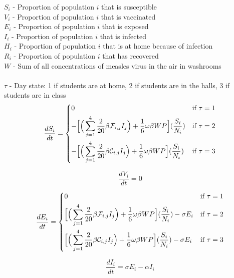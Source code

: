 \documentclass[fleqn]{article}
\begin{document}
$S_i$ - Proportion of population $i$ that is susceptible \\
$V_i$ - Proportion of population $i$ that is vaccinated \\
$E_i$ - Proportion of population $i$ that is exposed \\
$I_i$ - Proportion of population $i$ that is infected \\
$H_i$ - Proportion of population $i$ that is at home because of infection \\
$R_i$ - Proportion of population $i$ that has recovered \\
$W$ - Sum of all concentrations of measles virus in the air in washrooms\\ \\
$\tau$ - Day state: 1 if students are at home, 2 if students are in the halls, 3 if \indent students are in class
\begin{equation}
\dfrac{dS_i}{dt} = 
\begin{dcases}
	0 & \text{if $\tau = 1$} \\
	- \Big[\Big(\sum_{j=1}^4 \dfrac{2}{20} \beta \mathcal{F}_{i,j} I_j \Big) + \dfrac{1}{6} \omega \beta W P \Big](\dfrac{S_i}{N_i}) & \text{if $\tau = 2$} \\
	- \Big[\Big(\sum_{j=1}^4 \dfrac{2}{20} \beta \mathcal{C}_{i,j} I_j \Big) + \dfrac{1}{6} \omega \beta W P \Big](\dfrac{S_i}{N_i}) & \text{if $\tau = 3$} 	
\end{dcases}
\end{equation}

\begin{equation}
\dfrac{dV_i}{dt} = 0
\end{equation}

\begin{equation}
\dfrac{dE_i}{dt} = 
\begin{dcases}
	0 & \text{if $\tau = 1$} \\
	\Big[\Big(\sum_{j=1}^4 \dfrac{2}{20} \beta \mathcal{F}_{i,j} I_j \Big) + \dfrac{1}{6} \omega \beta W P \Big](\dfrac{S_i}{N_i}) - \sigma E_i & \text{if $\tau = 2$} \\
	\Big[\Big(\sum_{j=1}^4 \dfrac{2}{20} \beta \mathcal{C}_{i,j} I_j \Big) + \dfrac{1}{6} \omega \beta W P \Big](\dfrac{S_i}{N_i}) - \sigma E_i & \text{if $\tau = 3$} 	
\end{dcases}
\end{equation}

\begin{equation}
\dfrac{dI_i}{dt} = \sigma E_i - \alpha I_i
\end{equation}
\end{document}
